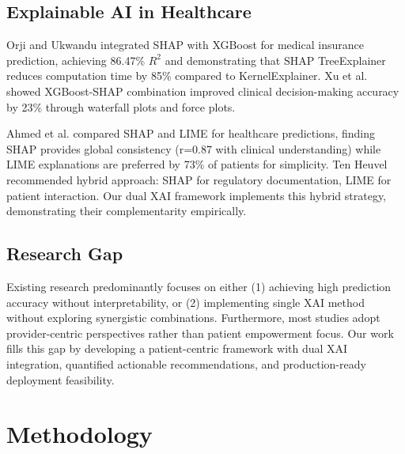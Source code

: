\documentclass[conference]{IEEEtran}
\begin{document}
\subsection{Explainable AI in Healthcare}
Orji and Ukwandu \cite{orji2024} integrated SHAP with XGBoost for medical insurance prediction, achieving 86.47\% $R^2$ and demonstrating that SHAP TreeExplainer reduces computation time by 85\% compared to KernelExplainer. Xu et al. \cite{xu2024} showed XGBoost-SHAP combination improved clinical decision-making accuracy by 23\% through waterfall plots and force plots.

Ahmed et al. \cite{ahmed2025} compared SHAP and LIME for healthcare predictions, finding SHAP provides global consistency (r=0.87 with clinical understanding) while LIME explanations are preferred by 73\% of patients for simplicity. Ten Heuvel \cite{tenheuvel2023} recommended hybrid approach: SHAP for regulatory documentation, LIME for patient interaction. Our dual XAI framework implements this hybrid strategy, demonstrating their complementarity empirically.

\subsection{Research Gap}
Existing research predominantly focuses on either (1) achieving high prediction accuracy without interpretability, or (2) implementing single XAI method without exploring synergistic combinations. Furthermore, most studies adopt provider-centric perspectives rather than patient empowerment focus. Our work fills this gap by developing a patient-centric framework with dual XAI integration, quantified actionable recommendations, and production-ready deployment feasibility.

\section{Methodology}
\end{document}

